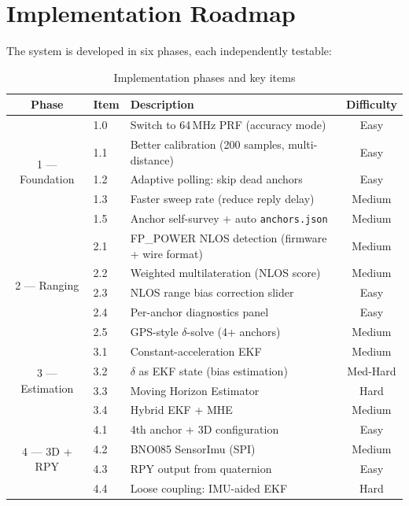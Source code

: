 \documentclass[11pt,a4paper]{article}
\begin{document}
\section{Implementation Roadmap}

The system is developed in six phases, each independently testable:

\begin{table}[ht]
\centering
\caption{Implementation phases and key items}
\begin{tabular}{cllc}
\toprule
\textbf{Phase} & \textbf{Item} & \textbf{Description} & \textbf{Difficulty} \\
\midrule
\multirow{5}{*}{1 --- Foundation}
 & 1.0 & Switch to 64\,MHz PRF (accuracy mode) & Easy \\
 & 1.1 & Better calibration (200 samples, multi-distance) & Easy \\
 & 1.2 & Adaptive polling: skip dead anchors & Easy \\
 & 1.3 & Faster sweep rate (reduce reply delay) & Medium \\
 & 1.5 & Anchor self-survey + auto \texttt{anchors.json} & Medium \\
\midrule
\multirow{5}{*}{2 --- Ranging}
 & 2.1 & FP\_POWER NLOS detection (firmware + wire format) & Medium \\
 & 2.2 & Weighted multilateration (NLOS score) & Medium \\
 & 2.3 & NLOS range bias correction slider & Easy \\
 & 2.4 & Per-anchor diagnostics panel & Easy \\
 & 2.5 & GPS-style $\delta$-solve (4+ anchors) & Medium \\
\midrule
\multirow{4}{*}{3 --- Estimation}
 & 3.1 & Constant-acceleration EKF & Medium \\
 & 3.2 & $\delta$ as EKF state (bias estimation) & Med-Hard \\
 & 3.3 & Moving Horizon Estimator & Hard \\
 & 3.4 & Hybrid EKF + MHE & Medium \\
\midrule
\multirow{5}{*}{4 --- 3D + RPY}
 & 4.1 & 4th anchor + 3D configuration & Easy \\
 & 4.2 & BNO085 SensorImu (SPI) & Medium \\
 & 4.3 & RPY output from quaternion & Easy \\
 & 4.4 & Loose coupling: IMU-aided EKF & Hard \\

\end{tabular}
\end{table}
\end{document}
